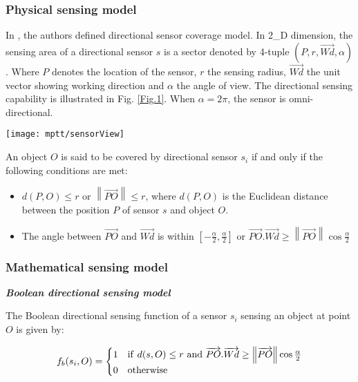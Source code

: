 \documentclass[final]{elsarticle}
\begin{document}
\subsubsection{Physical sensing model}
In \cite{b10}, the authors defined directional sensor coverage model. In 2\_D dimension, the sensing area of a directional sensor $ s $ is a sector denoted by 4-tuple $( P, r, \overrightarrow{Wd}, \alpha )$. Where $ P $ denotes the location of the sensor, $ r $ the sensing radius, $ \overrightarrow{Wd}$ the unit vector showing working direction and $ \alpha $ the angle of view. The directional sensing capability is illustrated in Fig. \ref{Fig.1}. When $\alpha=2\pi$, the sensor is omni-directional.\\
\begin{figure*}[h]
	\centering
	\texttt{[image: mptt/sensorView]}
	\caption{Sensing capability of directional sensor}
	\label{Fig.1}       %
\end{figure*}
An object $ O $ is said to be covered by directional sensor $ s_i $ if and only if the following conditions are met: 
\begin{itemize}
	\itemsep0em
	\item $d(P,O) \le r$ or $\left\| {\overrightarrow {PO} } \right\| \le r$, where $d(P,O)$ is the Euclidean distance between the position $ P $ of sensor $s$ and object $ O $.
	\item The angle between $\overrightarrow{PO}$ and $\overrightarrow {Wd} $ is within $\left[ { - \frac{\alpha}{2} ,\frac{\alpha}{2} } \right]$ or $\overrightarrow {PO} .\overrightarrow {Wd}  \ge \left\| {\overrightarrow {PO} } \right\|\cos \frac{\alpha}{2} $	
\end{itemize}
\subsubsection{Mathematical sensing model}
\textbf{\textit{Boolean directional sensing model}}

The Boolean directional sensing function of a sensor $ s_i $ sensing an object at point $ O $ is given by:

\begin{equation}
	\label{eqfb}
f_b({s_i},O) = \begin{cases}
	1 & {{\rm{if}} \ d(s,O) \le r{\rm{ \ and }} \ \overrightarrow {PO} .\overrightarrow {Wd}  \ge \left\| {\overrightarrow {PO} } \right\|\cos \frac{\alpha}{2} }\\
	0 & {\rm{otherwise}}
\end{cases}
\end{equation}
\end{document}
